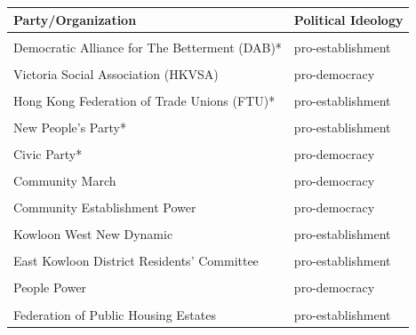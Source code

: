 \documentclass[letterpaper, 12pt]{article}
\begin{document}
\begin{appendices}
\clearpage
\begingroup\fontsize{12}{14}\selectfont
\begin{longtable}[c]{ll}
\toprule
\textbf{Party/Organization} & \textbf{Political Ideology}\\
\midrule
\cellcolor{gray!6}{The Democratic Party*} & \cellcolor{gray!6}{pro-democracy}\\
Democratic Alliance for The Betterment (DAB)* & pro-establishment\\
\cellcolor{gray!6}{Liberal Party*} & \cellcolor{gray!6}{pro-establishment}\\
Victoria Social Association (HKVSA) & pro-democracy\\
\cellcolor{gray!6}{Power For Democracy} & \cellcolor{gray!6}{pro-democracy}\\
Hong Kong Federation of Trade Unions (FTU)* & pro-establishment\\
\cellcolor{gray!6}{Business and Professionals Alliance (BPA)*} & \cellcolor{gray!6}{pro-establishment}\\
New People's Party* & pro-establishment\\
\cellcolor{gray!6}{Labour Party*} & \cellcolor{gray!6}{pro-democracy}\\
Civic Party* & pro-democracy\\
\cellcolor{gray!6}{League of Social Democrats} & \cellcolor{gray!6}{pro-democracy}\\
Community March & pro-democracy\\
\cellcolor{gray!6}{Association for Democracy and People's Livelihood (ADPL)} & \cellcolor{gray!6}{pro-democracy}\\
Community Establishment Power & pro-democracy\\
\cellcolor{gray!6}{The Federation of Hong Kong \& Kowloon Labour Unions} & \cellcolor{gray!6}{pro-establishment}\\
Kowloon West New Dynamic & pro-establishment\\
\cellcolor{gray!6}{Klcmatters} & \cellcolor{gray!6}{pro-democracy}\\
East Kowloon District Residents' Committee & pro-establishment\\
\cellcolor{gray!6}{Tsz Wan Shan Constructive Power} & \cellcolor{gray!6}{pro-democracy}\\
People Power & pro-democracy\\
\cellcolor{gray!6}{Choi Hung Estate Social Service Association} & \cellcolor{gray!6}{pro-democracy}\\
Federation of Public Housing Estates & pro-establishment\\

\end{longtable}
\end{appendices}
\end{document}
